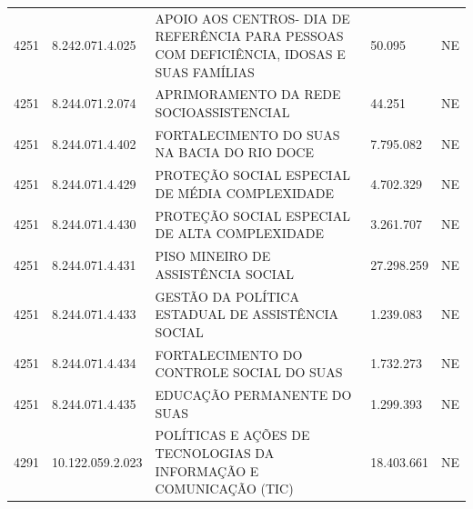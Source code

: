 \documentclass{article}
\begin{document}
\begin{longtable}[c]{m{1cm}|m{2cm}|m{10cm}|m{2cm}|m{1cm}}
\multicolumn{1}{C{1cm}|}{4251} & \multicolumn{1}{C{2cm}|}{8.242.071.4.025} & \multicolumn{1}{L{10cm}|}{APOIO AOS CENTROS- DIA DE REFERÊNCIA PARA PESSOAS COM DEFICIÊNCIA, IDOSAS E SUAS FAMÍLIAS} & \multicolumn{1}{R{2cm}|}{50.095} & \multicolumn{1}{C{1cm}}{NE} \\
\multicolumn{1}{C{1cm}|}{4251} & \multicolumn{1}{C{2cm}|}{8.244.071.2.074} & \multicolumn{1}{L{10cm}|}{APRIMORAMENTO DA REDE SOCIOASSISTENCIAL} & \multicolumn{1}{R{2cm}|}{44.251} & \multicolumn{1}{C{1cm}}{NE} \\
\multicolumn{1}{C{1cm}|}{4251} & \multicolumn{1}{C{2cm}|}{8.244.071.4.402} & \multicolumn{1}{L{10cm}|}{FORTALECIMENTO DO SUAS NA BACIA DO RIO DOCE} & \multicolumn{1}{R{2cm}|}{7.795.082} & \multicolumn{1}{C{1cm}}{NE} \\
\multicolumn{1}{C{1cm}|}{4251} & \multicolumn{1}{C{2cm}|}{8.244.071.4.429} & \multicolumn{1}{L{10cm}|}{PROTEÇÃO SOCIAL ESPECIAL DE MÉDIA COMPLEXIDADE} & \multicolumn{1}{R{2cm}|}{4.702.329} & \multicolumn{1}{C{1cm}}{NE} \\
\multicolumn{1}{C{1cm}|}{4251} & \multicolumn{1}{C{2cm}|}{8.244.071.4.430} & \multicolumn{1}{L{10cm}|}{PROTEÇÃO SOCIAL ESPECIAL DE ALTA COMPLEXIDADE} & \multicolumn{1}{R{2cm}|}{3.261.707} & \multicolumn{1}{C{1cm}}{NE} \\
\multicolumn{1}{C{1cm}|}{4251} & \multicolumn{1}{C{2cm}|}{8.244.071.4.431} & \multicolumn{1}{L{10cm}|}{PISO MINEIRO DE ASSISTÊNCIA SOCIAL} & \multicolumn{1}{R{2cm}|}{27.298.259} & \multicolumn{1}{C{1cm}}{NE} \\
\multicolumn{1}{C{1cm}|}{4251} & \multicolumn{1}{C{2cm}|}{8.244.071.4.433} & \multicolumn{1}{L{10cm}|}{GESTÃO DA POLÍTICA ESTADUAL DE ASSISTÊNCIA SOCIAL} & \multicolumn{1}{R{2cm}|}{1.239.083} & \multicolumn{1}{C{1cm}}{NE} \\
\multicolumn{1}{C{1cm}|}{4251} & \multicolumn{1}{C{2cm}|}{8.244.071.4.434} & \multicolumn{1}{L{10cm}|}{FORTALECIMENTO DO CONTROLE SOCIAL DO SUAS} & \multicolumn{1}{R{2cm}|}{1.732.273} & \multicolumn{1}{C{1cm}}{NE} \\
\multicolumn{1}{C{1cm}|}{4251} & \multicolumn{1}{C{2cm}|}{8.244.071.4.435} & \multicolumn{1}{L{10cm}|}{EDUCAÇÃO PERMANENTE DO SUAS} & \multicolumn{1}{R{2cm}|}{1.299.393} & \multicolumn{1}{C{1cm}}{NE} \\
\multicolumn{1}{C{1cm}|}{4291} & \multicolumn{1}{C{2cm}|}{10.122.059.2.023} & \multicolumn{1}{L{10cm}|}{POLÍTICAS E AÇÕES DE TECNOLOGIAS DA INFORMAÇÃO E COMUNICAÇÃO (TIC)} & \multicolumn{1}{R{2cm}|}{18.403.661} & \multicolumn{1}{C{1cm}}{NE} \\

\end{longtable}
\end{document}
